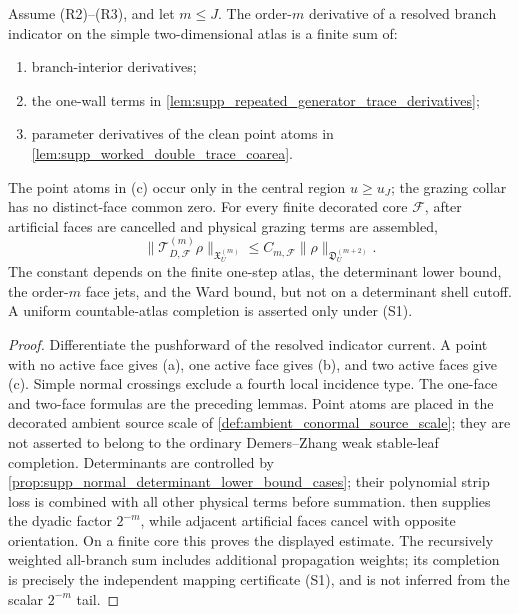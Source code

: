 \begin{proposition}
\label{prop:supp_two_wall_higher_order_response_closure}
Assume (R2)--(R3), and let \(m\le J\).  The order-\(m\) derivative of a
resolved branch indicator on the simple two-dimensional atlas is a finite sum
of:
\begin{enumerate}[label=\textup{(\alph*)},wide,labelindent=0pt]
  \item branch-interior derivatives;
  \item the one-wall terms in
  \cref{lem:supp_repeated_generator_trace_derivatives};
  \item parameter derivatives of the clean point atoms in
  \cref{lem:supp_worked_double_trace_coarea}.
\end{enumerate}
The point atoms in (c) occur only in the central region \(u\ge u_J\); the
grazing collar has no distinct-face common zero.
For every finite decorated core \(\mathscr F\), after artificial faces are
cancelled and physical grazing terms are assembled,
\[
  \|\mathcal T_{D,\mathscr F}^{(m)}\rho\|_{\mathfrak X_U^{(m)}}
  \le C_{m,\mathscr F}\|\rho\|_{\mathfrak D_U^{(m+2)}} .
\]
The constant depends on the finite one-step atlas, the determinant lower
bound, the order-\(m\) face jets, and the Ward bound, but not on a determinant
shell cutoff.  A uniform countable-atlas completion is asserted only under
(S1).
\end{proposition}

\begin{proof}
Differentiate the pushforward of the resolved indicator current.  A point
with no active face gives (a), one active face gives (b), and two active faces
give (c).  Simple normal crossings exclude a fourth local incidence type.
The one-face and two-face formulas are the preceding lemmas.  Point atoms are
placed in the decorated ambient source scale of
\cref{def:ambient_conormal_source_scale}; they are not asserted to belong to
the ordinary Demers--Zhang weak stable-leaf completion.  Determinants are
controlled by
\cref{prop:supp_normal_determinant_lower_bound_cases}; their polynomial strip
loss is combined with all other physical terms before summation.
 then supplies the dyadic
factor \(2^{-m}\), while adjacent artificial faces cancel with opposite
orientation.  On a finite core this proves the displayed estimate.  The
recursively weighted all-branch sum includes additional propagation weights;
its completion is precisely the independent mapping certificate (S1), and is
not inferred from the scalar \(2^{-m}\) tail.
\end{proof}

